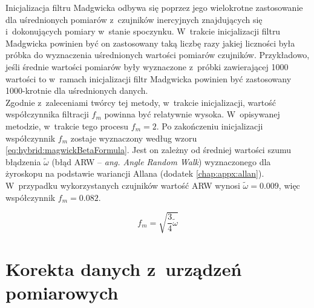 Inicjalizacja filtru Madgwicka odbywa się poprzez jego wielokrotne zastosowanie dla uśrednionych pomiarów z~czujników inercyjnych znajdujących się i~dokonujących pomiary w~stanie spoczynku. W~trakcie inicjalizacji filtru Madgwicka powinien być on zastosowany taką liczbę razy jakiej liczności była próbka do wyznaczenia uśrednionych wartości pomiarów czujników. Przykładowo, jeśli średnie wartości pomiarów były wyznaczone z~próbki zawierającej 1000 wartości to w~ramach inicjalizacji filtr Madgwicka powinien być zastosowany 1000-krotnie dla uśrednionych danych.\\
		
Zgodnie z~zaleceniami twórcy tej metody, w~trakcie inicjalizacji, wartość współczynnika filtracji $f_m$ powinna być relatywnie wysoka. W~opisywanej metodzie, w~trakcie tego procesu $f_m = 2$. Po zakończeniu inicjalizacji współczynnik $f_m$ zostaje wyznaczony według wzoru \ref{eq:hybrid:magwickBetaFormula}. Jest on zależny od średniej wartości szumu błądzenia $\widetilde{\omega}$ (błąd ARW -- \emph{ang. Angle Random Walk}) wyznaczonego dla żyroskopu na podstawie wariancji Allana (dodatek \ref{chap:appx:allan}). W~przypadku wykorzystanych czujników wartość ARW wynosi $\widetilde{\omega} = 0.009$, więc współczynnik $f_m = 0.082$.
		
\begin{equation}
	f_m = \sqrt{\frac{3}{4}\widetilde{\omega}}
	\label{eq:hybrid:magwickBetaFormula}
\end{equation}
		
\section{Korekta danych z~urządzeń pomiarowych}
		
